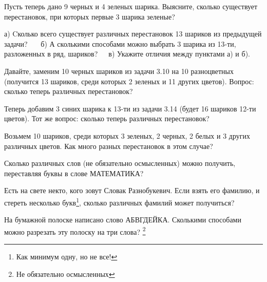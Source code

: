 \begin{thm}
	Пусть теперь дано 9 черных и 4 зеленых шарика. Выясните, сколько существует перестановок, при которых первые 3 шарика зеленые?
\end{thm}

\begin{thm}	
	а) Cколько всего существует различных перестановок 13 шариков из предыдущей задачи?~~~ б) А сколькими способами можно выбрать 3 шарика из 13-ти, разложенных в ряд, шариков?~~~в) Укажите отличия между пунктами а) и б).
\end{thm}

\begin{thm}
	Давайте, заменим 10 черных шариков из задачи 3.10 на 10 разноцветных (получится 13 шариков, среди которых 2 зеленых и 11 других цветов). Вопрос: сколько теперь различных перестановок?
\end{thm}

\begin{thm}
	Теперь добавим 3 синих шарика к 13-ти из задачи 3.14 (будет 16 шариков 12-ти цветов). Тот же вопрос: сколько теперь различных перестановок?
\end{thm}

\begin{thm}	
	Возьмем 10 шариков, среди которых 3 зеленых, 2 черных, 2 белых и 3 других различных цветов. Как много разных перестановок в этом случае?
\end{thm}

\begin{thm}	
	Сколько различных слов (не обязательно осмысленных) можно получить, переставляя буквы в слове МАТЕМАТИКА?
\end{thm}

\begin{thm}	
	Есть на свете некто, кого зовут Словак Разнобукевич. Если взять его фамилию, и стереть несколько букв\footnote{Как минимум одну, но не все!}, сколько различных фамилий может получиться?
\end{thm}

\begin{thm}\label{3.17}
	На бумажной полоске написано слово АБВГДЕЙКА. Сколькими способами можно разрезать эту полоску на три слова? \footnote{Не обязательно осмысленных}
\end{thm}


